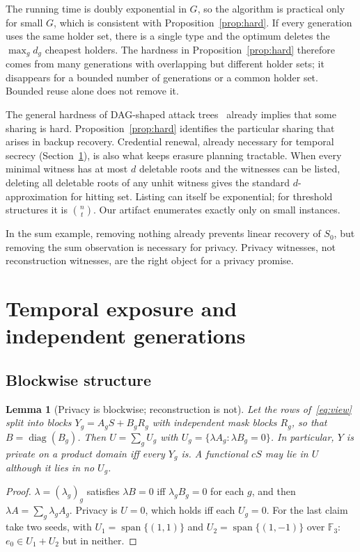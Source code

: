 \documentclass[pdflatex,sn-mathphys-num]{sn-jnl}
\theoremstyle{plain}
\newtheorem{lemma}[theorem]{Lemma}
\theoremstyle{definition}
\newcommand{\F}{\mathbb{F}}
\begin{document}
The running time is doubly exponential in $G$, so the algorithm is practical only for small $G$, which is consistent with Proposition~\ref{prop:hard}. If every generation uses the same holder set, there is a single type and the optimum deletes the $\max_gd_g$ cheapest holders. The hardness in Proposition~\ref{prop:hard} therefore comes from many generations with overlapping but different holder sets; it disappears for a bounded number of generations or a common holder set. Bounded reuse alone does not remove it.

The general hardness of DAG-shaped attack trees~\cite{lopuhaa2022} already implies that some sharing is hard. Proposition~\ref{prop:hard} identifies the particular sharing that arises in backup recovery. Credential renewal, already necessary for temporal secrecy (Section~\ref{sec:temporal}), is also what keeps erasure planning tractable. When every minimal witness has at most $d$ deletable roots and the witnesses can be listed, deleting all deletable roots of any unhit witness gives the standard $d$-approximation for hitting set. Listing can itself be exponential; for threshold structures it is $\binom{n}{t}$. Our artifact enumerates exactly only on small instances.

In the sum example, removing nothing already prevents linear recovery of $S_0$, but removing the sum observation is necessary for privacy. Privacy witnesses, not reconstruction witnesses, are the right object for a privacy promise.


\section{Temporal exposure and independent generations}\label{sec:temporal}

\subsection{Blockwise structure}
\begin{lemma}[Privacy is blockwise; reconstruction is not]\label{lem:block}
Let the rows of~\eqref{eq:view} split into blocks $Y_g=A_gS+B_gR_g$ with independent mask blocks $R_g$, so that $B=\operatorname{diag}(B_g)$. Then $U=\sum_gU_g$ with $U_g=\{\lambda A_g:\lambda B_g=0\}$. In particular, $Y$ is private on a product domain iff every $Y_g$ is. A functional $cS$ may lie in $U$ although it lies in no $U_g$.
\end{lemma}
\begin{proof}
$\lambda=(\lambda_g)_g$ satisfies $\lambda B=0$ iff $\lambda_gB_g=0$ for each $g$, and then $\lambda A=\sum_g\lambda_gA_g$. Privacy is $U=0$, which holds iff each $U_g=0$. For the last claim take two seeds, with $U_1=\operatorname{span}\{(1,1)\}$ and $U_2=\operatorname{span}\{(1,-1)\}$ over $\F_3$: $e_0\in U_1+U_2$ but in neither.
\end{proof}
\end{document}

